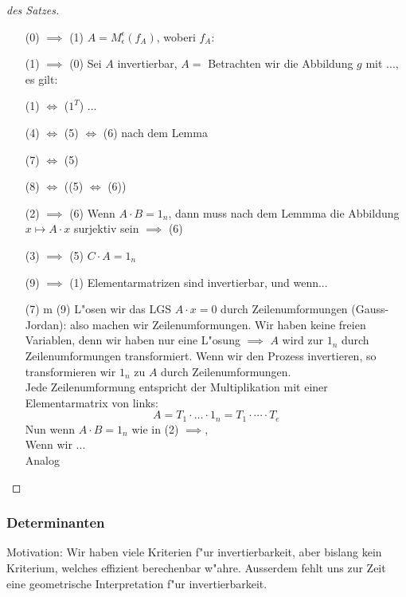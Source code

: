 \documentclass[11pt]{article}
\begin{document}
\begin{proof}[des Satzes]
  \begin{itemize}
  \item[(0) $\implies$ (1)]  $A=M^{\epsilon}_{\epsilon}(f_A)$, woberi $f_A:$
  \item[(1) $\implies$ (0)] Sei $A$ invertierbar, $A=$ Betrachten wir die
    Abbildung $g$ mit ..., es gilt: 
  \item[(1) $\iff$ ($1^T$)] ...
  \item[(4) $ \iff $ (5) $ \iff $ (6)] nach dem Lemma
  \item[(7) $ \iff $ (5)]
  \item[(8) $ \iff $ ((5) $ \iff $ (6))]
  \item[(2) $ \implies $ (6)] Wenn $A\cdot B=1_n$, dann muss nach dem Lemmma die
    Abbildung $x\mapsto A\cdot x$ surjektiv sein $\implies$ (6)
  \item[(3) $ \implies $ (5)] $C\cdot A = 1_n$
  \item[(9) $ \implies $ (1)] Elementarmatrizen sind invertierbar, und wenn...
  \item[(7) m (9)] L"osen wir das LGS $A\cdot x = 0$ durch
    Zeilenumformungen (Gauss-Jordan): also machen wir Zeilenumformungen. Wir
    haben keine freien Variablen, denn wir haben nur eine L"osung $\implies$
    $A$ wird zur $1_n$ durch Zeilenumformungen transformiert. Wenn wir den
    Prozess invertieren, so transformieren wir $1_n$ zu $A$ durch
    Zeilenumformungen. \\
    Jede Zeilenumformung entspricht der Multiplikation mit einer
    Elementarmatrix von links: \[A=T_1 \cdot \dots \cdot 1_n = T_1 \cdot \cdots
      \cdot T_e\]
    Nun wenn $A\cdot B = 1_n$ wie in (2) $\implies$, \\
    Wenn wir ... \\
    Analog
  \end{itemize}
\end{proof}

\subsubsection{Determinanten}
\label{sec:det}

Motivation: Wir haben viele Kriterien f"ur invertierbarkeit, aber bislang kein
Kriterium, welches effizient berechenbar w"ahre. Ausserdem fehlt uns zur Zeit
eine geometrische Interpretation f"ur invertierbarkeit.
\end{document}
